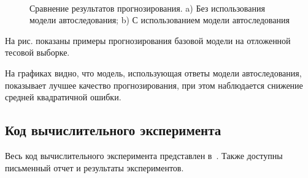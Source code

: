 \begin{figure}[h!t]\center
{}
\\
\caption{Сравнение результатов прогнозирования. a) Без использования модели автоследования; b) С использованием модели автоследования}
\end{figure}

На рис. показаны примеры прогнозирования базовой модели на отложенной тесовой выборке.

На графиках видно, что модель, использующая ответы модели автоследования, показывает лучшее качество прогнозирования, при этом наблюдается снижение средней квадратичной ошибки. 

\subsection{Код вычислительного эксперимента}

Весь код вычислительного эксперимента представлен в~\cite{Github}. Также доступны письменный отчет и результаты экспериментов.
